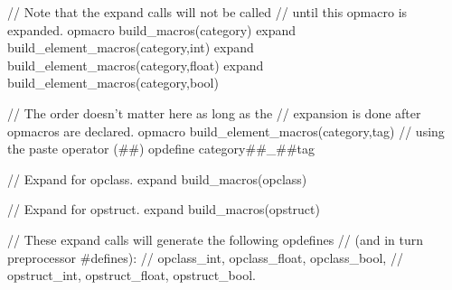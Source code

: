 \begin{opcpp}[label={fig:expand2},caption={Advanced use of \opcppK{expand} and \opcppK{opmacro} in \opCPP.}]
// Note that the expand calls will not be called 
// until this opmacro is expanded.
opmacro build_macros(category)
{
	expand build_element_macros(category,int)
	expand build_element_macros(category,float)
	expand build_element_macros(category,bool)
}

// The order doesn't matter here as long as the 
// expansion is done after opmacros are declared.
opmacro build_element_macros(category,tag)
{
	// using the paste operator (##)
	opdefine category##_##tag
	{
	}
}

// Expand for opclass.
expand build_macros(opclass)

// Expand for opstruct.
expand build_macros(opstruct)

// These expand calls will generate the following opdefines
// (and in turn preprocessor #defines):
// opclass_int, opclass_float, opclass_bool,
// opstruct_int, opstruct_float, opstruct_bool.
\end{opcpp}
